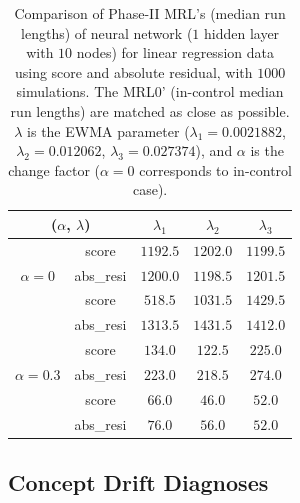 \documentclass[twoside,11pt]{article}
\begin{document}
\begin{table}[!t]
\centering
\begin{tabular}{ccccc}
\toprule
\multicolumn{2}{c}{($ \alpha$, $ \lambda$)} & {$ \lambda_1$} & {$ \lambda_2$} & {$ \lambda_3$} \\
\midrule
\multirow{3}{*}{$\alpha=0$} & score &$1192.5$ & $1202.0$ & $1199.5$ \\
& abs\_resi &$1200.0$ & $1198.5$ & $1201.5$ \\
\midrule
\multirow{3}{*}{$\alpha=0.1$} & score &$\bm {518.5}$ & $\bm{1031.5}$ & $1429.5$ \\
& abs\_resi &$1313.5$ & $1431.5$ & $\bm{1412.0}$ \\
\midrule
\multirow{3}{*}{$\alpha=0.3$} & score &$\bm{134.0}$ & $\bm{122.5}$ & $\bm{225.0}$ \\
& abs\_resi &$223.0$ & $218.5$ & $274.0$ \\
\midrule
\multirow{3}{*}{$\alpha=0.5$} & score &$\bm{66.0}$ & $\bm{46.0}$ & ${52.0}$ \\
& abs\_resi &$76.0$ & $56.0$ & $52.0$ \\
\midrule
\end{tabular}
\caption{Comparison of Phase-II MRL's (median run lengths) of neural network ($1$ hidden layer with $10$ nodes) for linear regression data using score and absolute residual, with $1000$ simulations. The MRL0' (in-control median run lengths) are matched as close as possible. $ \lambda$ is the EWMA parameter ({$ \lambda_1=0.0021882$}, {$ \lambda_2=0.012062$}, {$ \lambda_3=0.027374$}), and $ \alpha$ is the change factor ($ \alpha=0$ corresponds to in-control case).}
\label{tab:lin_nnet_MRL}
\end{table}

\subsection{Concept Drift Diagnoses}
\end{document}
